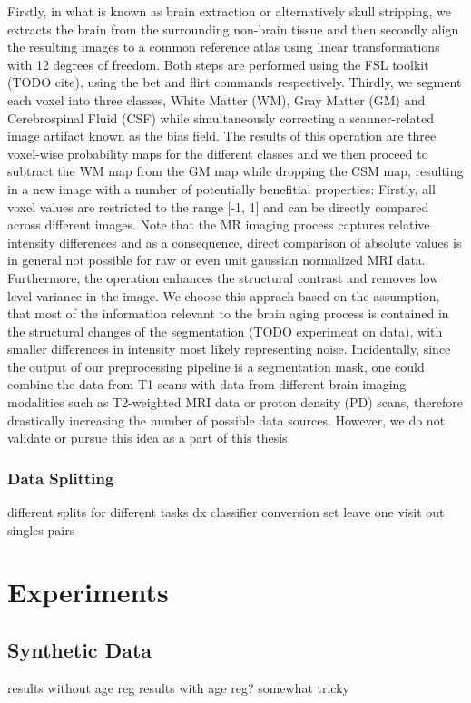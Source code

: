 Firstly, in what is known as brain extraction or alternatively skull stripping, we extracts the brain from the surrounding non-brain tissue and then secondly align the resulting images to a common reference atlas using linear transformations with 12 degrees of freedom. Both steps are performed using the FSL toolkit (TODO cite), using the bet and flirt commands respectively. Thirdly, we segment each voxel into three classes, White Matter (WM), Gray Matter (GM) and Cerebrospinal Fluid (CSF) while simultaneously correcting a scanner-related image artifact known as the bias field. The results of this operation are three voxel-wise probability maps for the different classes and we then proceed to subtract the WM map from the GM map while dropping the CSM map, resulting in a new image with a number of potentially benefitial properties: Firstly, all voxel values are restricted to the range [-1, 1] and can be directly compared across different images. Note that the MR imaging process captures relative intensity differences and as a consequence, direct comparison of absolute values is in general not possible for raw or even unit gaussian normalized MRI data. Furthermore, the operation enhances the structural contrast and removes low level variance in the image. We choose this apprach based on the assumption, that most of the information relevant to the brain aging process is contained in the structural changes of the segmentation (TODO experiment on data), with smaller differences in intensity most likely representing noise.
Incidentally, since the output of our preprocessing pipeline is a segmentation mask, one could combine the data from T1 scans with data from different brain imaging modalities such as T2-weighted MRI data or proton density (PD) scans, therefore drastically increasing the number of possible data sources. However, we do not validate or pursue this idea as a part of this thesis.

\subsection{Data Splitting}
different splits for different tasks
dx classifier
conversion set
leave one visit out
singles
pairs

\chapter{Experiments}

\section{Synthetic Data}
results without age reg
results with age reg? somewhat tricky

